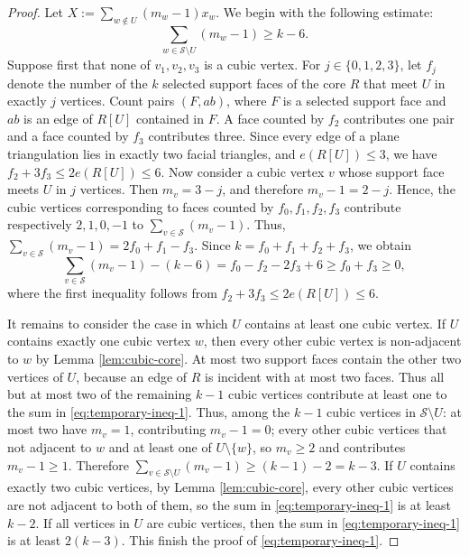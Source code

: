 \documentclass[11pt]{article}
\theoremstyle{plain}
\theoremstyle{definition}
\numberwithin{equation}{section}
\begin{document}
\begin{proof}
Let $X := \sum_{w\notin U} (m_w - 1) x_w$. We begin with the following estimate:
\begin{equation}\label{eq:temporary-ineq-1}
\sum_{w\in\mathcal{S}\setminus U} (m_w - 1)\geq k - 6.
\end{equation}
Suppose first that none of $v_1,v_2,v_3$ is a cubic vertex. For
$j\in\{0,1,2,3\}$, let $f_j$ denote the number of the $k$ selected
support faces of the core $R$ that meet $U$ in exactly $j$
vertices. Count pairs $(F,ab)$, where $F$ is a selected support face
and $ab$ is an edge of $R[U]$ contained in $F$. A face counted by
$f_2$ contributes one pair and a face counted by $f_3$ contributes
three. Since every edge of a plane triangulation lies in exactly two facial
triangles, and $e(R[U])\leq 3$, we have $f_2 + 3f_3\leq 2e(R[U])\leq 6$. Now consider
a cubic vertex $v$ whose support face meets $U$ in $j$ vertices. Then $m_v = 3 - j$, 
and therefore $m_v - 1 = 2 - j$. Hence, the cubic vertices corresponding to faces 
counted by $f_0,f_1,f_2,f_3$ contribute respectively $2,1,0,-1$ to $\sum_{v\in\mathcal{S}} (m_v - 1)$. 
Thus, $\sum_{v\in\mathcal{S}} (m_v - 1) = 2f_0 + f_1 - f_3$. Since $k = f_0 + f_1 + f_2 + f_3$, we obtain
\[
\sum_{v\in\mathcal{S}} (m_v - 1) - (k - 6) = f_0 - f_2 - 2f_3 + 6 \geq f_0 + f_3\geq 0,
\]
where the first inequality follows from $f_2 + 3f_3\leq 2e(R[U])\leq 6$.

It remains to consider the case in which $U$ contains at least one cubic vertex. If $U$ contains 
exactly one cubic vertex $w$, then every other cubic vertex is non-adjacent to $w$ by 
Lemma \ref{lem:cubic-core}. At most two support faces contain the other two vertices of
$U$, because an edge of $R$ is incident with at most two faces.
Thus all but at most two of the remaining $k - 1$ cubic vertices contribute at
least one to the sum in \eqref{eq:temporary-ineq-1}. Thus, among the $k - 1$ cubic vertices 
in $\mathcal{S}\setminus U$: at most two have $m_v = 1$, contributing $m_v - 1 = 0$; every other cubic vertices 
that not adjacent to $w$ and at least one of $U\setminus\{w\}$, so $m_v\geq 2$ and contributes $m_v - 1\geq 1$. 
Therefore $\sum_{v\in\mathcal{S}\setminus U} (m_v - 1)\geq (k - 1) - 2 = k - 3$. 
If $U$ contains exactly two cubic vertices, by Lemma \ref{lem:cubic-core}, every other cubic 
vertices are not adjacent to both of them, so the sum in \eqref{eq:temporary-ineq-1} is at least $k - 2$. 
If all vertices in $U$ are cubic vertices, then the sum in \eqref{eq:temporary-ineq-1} is at least $2(k-3)$. 
This finish the proof of \eqref{eq:temporary-ineq-1}.


\end{proof}
\end{document}
